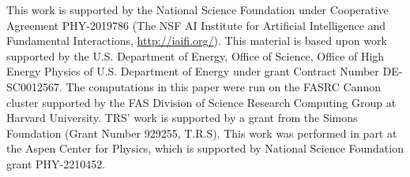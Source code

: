 \documentclass{article}
\theoremstyle{plain}
\theoremstyle{definition}
\theoremstyle{remark}
\begin{document}
This work is supported by the National Science Foundation under Cooperative Agreement PHY-2019786 (The NSF AI Institute for Artificial Intelligence and Fundamental Interactions, \url{http://iaifi.org/}). This material is based upon work supported by the U.S. Department of Energy, Office of Science, Office of High Energy Physics of U.S. Department of Energy under grant Contract Number  DE-SC0012567. The computations in this paper were run on the FASRC Cannon cluster supported by the FAS Division of Science Research Computing Group at Harvard University. TRS' work is supported by a grant from the Simons Foundation (Grant Number 929255, T.R.S). This work was performed in part at the Aspen Center for Physics, which is supported by National Science Foundation grant PHY-2210452.






\end{document}
